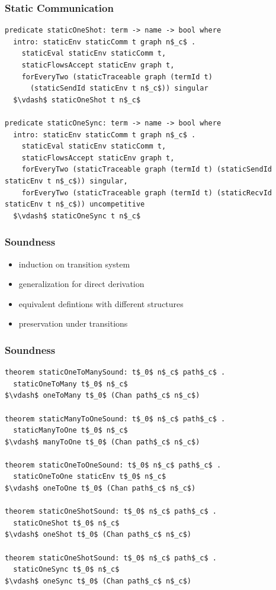 \documentclass{beamer}
\begin{document}
\begin{frame}[fragile]
	\frametitle{Static Communication}
\begin{lstlisting}[language=logic, mathescape]
predicate staticOneShot: term -> name -> bool where
  intro: staticEnv staticComm t graph n$_c$ .
    staticEval staticEnv staticComm t,
    staticFlowsAccept staticEnv graph t,
    forEveryTwo (staticTraceable graph (termId t)
      (staticSendId staticEnv t n$_c$)) singular
  $\vdash$ staticOneShot t n$_c$

predicate staticOneSync: term -> name -> bool where
  intro: staticEnv staticComm t graph n$_c$ .
    staticEval staticEnv staticComm t,
    staticFlowsAccept staticEnv graph t,
    forEveryTwo (staticTraceable graph (termId t) (staticSendId staticEnv t n$_c$)) singular,
    forEveryTwo (staticTraceable graph (termId t) (staticRecvId staticEnv t n$_c$)) uncompetitive
  $\vdash$ staticOneSync t n$_c$
\end{lstlisting}
\end{frame}


\begin{frame}
\frametitle{Soundness}
\begin{itemize}
\item induction on transition system 
\item generalization for direct derivation   
\item equivalent defintions with different structures 
\item preservation under transitions 
\end{itemize}
\end{frame}


\begin{frame}[fragile]
	\frametitle{Soundness}
\begin{lstlisting}[language=logic, mathescape]
theorem staticOneToManySound: t$_0$ n$_c$ path$_c$ . 
  staticOneToMany t$_0$ n$_c$
$\vdash$ oneToMany t$_0$ (Chan path$_c$ n$_c$)

theorem staticManyToOneSound: t$_0$ n$_c$ path$_c$ . 
  staticManyToOne t$_0$ n$_c$
$\vdash$ manyToOne t$_0$ (Chan path$_c$ n$_c$)

theorem staticOneToOneSound: t$_0$ n$_c$ path$_c$ . 
  staticOneToOne staticEnv t$_0$ n$_c$
$\vdash$ oneToOne t$_0$ (Chan path$_c$ n$_c$)

theorem staticOneShotSound: t$_0$ n$_c$ path$_c$ .
  staticOneShot t$_0$ n$_c$
$\vdash$ oneShot t$_0$ (Chan path$_c$ n$_c$)

theorem staticOneShotSound: t$_0$ n$_c$ path$_c$ .
  staticOneSync t$_0$ n$_c$
$\vdash$ oneSync t$_0$ (Chan path$_c$ n$_c$)
\end{lstlisting}
\end{frame}
\end{document}
